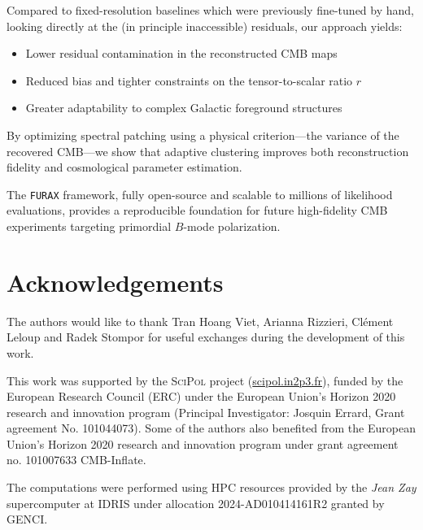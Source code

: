 \documentclass[fleqn,usenatbib]{mnras}
\begin{document}
Compared to fixed-resolution baselines which were previously fine-tuned by hand, looking directly at the (in principle inaccessible) residuals, our approach yields:
\begin{itemize}
    \item Lower residual contamination in the reconstructed CMB maps
    \item Reduced bias and tighter constraints on the tensor-to-scalar ratio \( r \)
    \item Greater adaptability to complex Galactic foreground structures
\end{itemize}

By optimizing spectral patching using a physical criterion---the variance of the recovered CMB---we show that adaptive clustering improves both reconstruction fidelity and cosmological parameter estimation. 

The \texttt{FURAX} framework, fully open-source and scalable to millions of likelihood evaluations, provides a reproducible foundation for future high-fidelity CMB experiments targeting primordial \( B \)-mode polarization.

\section*{Acknowledgements}


The authors would like to thank Tran Hoang Viet, Arianna Rizzieri, Cl\'ement Leloup and Radek Stompor for useful exchanges during the development of this work. 


This work was supported by the \textsc{SciPol} project (\href{https://scipol.in2p3.fr}{scipol.in2p3.fr}), funded by the European Research Council (ERC) under the European Union’s Horizon 2020 research and innovation program (Principal Investigator: Josquin Errard, Grant agreement No. 101044073). Some of the authors also benefited from the European Union’s Horizon 2020 research and innovation program under grant agreement no. 101007633 CMB-Inflate. 

The computations were performed using HPC resources provided by the \textit{Jean Zay} supercomputer at IDRIS under allocation 2024-AD010414161R2 granted by GENCI. 






\end{document}
